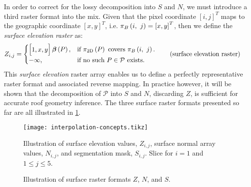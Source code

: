 In order to correct for the lossy decomposition into $S$ and $N$, we must introduce a third raster format into the mix.
Given that the pixel coordinate ${[i, j]}^T$ maps to the geographic coordinate $[x, y]^T$, i.e. $\pi_{B}\left(i,~j\right) = {[x, y]}^T$, then we define the \textit{surface elevation raster} as:
\begin{align*}
  Z_{i,j} &= \begin{cases}
    \begin{bmatrix}1, x, y\end{bmatrix} \planar{P}, &\text{if } \project{P} \text{ covers } \pixtogeo{i}{j}.\\
    -\infty, &\text{if no such } P \in \mathcal{P} \text{ exists}.
  \end{cases}
  \tag{surface elevation raster}%
  \label{eq:surface-elevation-raster}
\end{align*}
This \textit{surface elevation} raster array enables us to define a perfectly representative raster format and associated reverse mapping.
In practice however, it will be shown that the decomposition of $\mathcal{P}$ into $S$ and $N$, discarding $Z$, is sufficient for accurate roof geometry inference.
The three surface raster formats presented so far are all illustrated in \cref{fig:interpolation-concepts}.
\begin{figure}
  \centering
  \texttt{[image: interpolation-concepts.tikz]}
  \caption{Illustration of surface raster formats $Z$, $N$, and $S$.}{%
    Illustration of surface elevation values, $Z_{i,j}$, surface normal array values, $N_{i,j}$, and segmentation mask, $S_{i,j}$.
    Slice for $i = 1$ and $1 \leq j \leq 5$.
  }%
  \label{fig:interpolation-concepts}
\end{figure}

